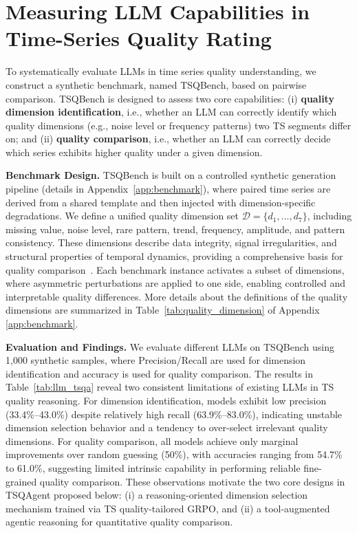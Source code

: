 \documentclass{article}
\newcommand{\partitle}[1]{\smallskip \noindent \textbf{#1.}}
\begin{document}
\section{Measuring LLM Capabilities in Time-Series Quality Rating}
\label{sec:benchmark}

To systematically evaluate LLMs in time series quality understanding, we construct a synthetic benchmark, named TSQBench, based on pairwise comparison. TSQBench is designed to assess two core capabilities: (i) \textbf{quality dimension identification}, i.e., whether an LLM can correctly identify which quality dimensions (e.g., noise level or frequency patterns) two TS segments differ on; and (ii) \textbf{quality comparison}, i.e., whether an LLM can correctly decide which series exhibits higher quality under a given dimension.


\partitle{Benchmark Design}
TSQBench is built on a controlled synthetic generation pipeline (details in Appendix~\ref{app:benchmark}), where paired time series are derived from a shared template and then injected with dimension-specific degradations. We define a unified quality dimension set $\mathcal{D}=\{d_1,\ldots,d_7\}$, including missing value, noise level, rare pattern, trend, frequency, amplitude, and pattern consistency. These dimensions describe data integrity, signal irregularities, and structural properties of temporal dynamics, providing a comprehensive basis for quality comparison~\citep{cleveland1990stl,hyndman2018forecasting,kazemi2019time2vec}. Each benchmark instance activates a subset of dimensions, where asymmetric perturbations are applied to one side, enabling controlled and interpretable quality differences. More details about the definitions of the quality dimensions are summarized in Table~\ref{tab:quality_dimension} of Appendix \ref{app:benchmark}.



\partitle{Evaluation and Findings}
We evaluate different LLMs on TSQBench using 1,000 synthetic samples, where Precision/Recall are used for dimension identification and accuracy is used for quality comparison.
The results in Table~\ref{tab:llm_tsqa} reveal two consistent limitations of existing LLMs in TS quality reasoning. For dimension identification, models exhibit low precision (33.4\%--43.0\%) despite relatively high recall (63.9\%--83.0\%), indicating unstable dimension selection behavior and a tendency to over-select irrelevant quality dimensions. For quality comparison, all models achieve only marginal improvements over random guessing (50\%), with accuracies ranging from 54.7\% to 61.0\%, suggesting limited intrinsic capability in performing reliable fine-grained quality comparison. These observations motivate the two core designs in TSQAgent proposed below: (i) a reasoning-oriented dimension selection mechanism trained via TS quality-tailored GRPO, and (ii) a tool-augmented agentic reasoning for quantitative quality comparison.
\end{document}
